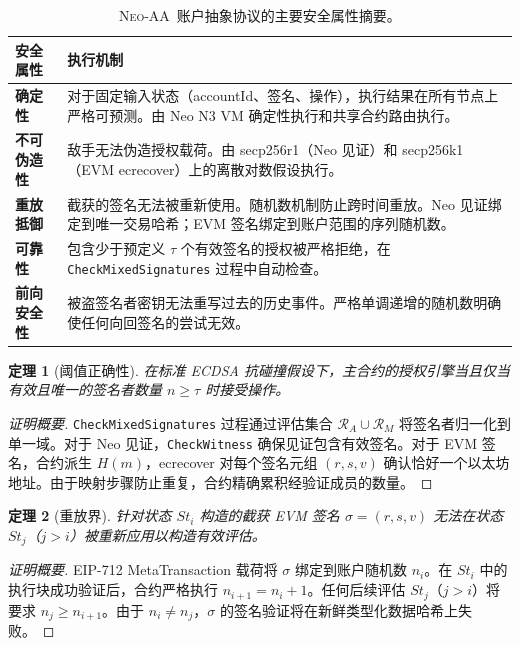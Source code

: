 \documentclass[10pt]{article}
\newtheorem{theorem}{定理}[section]
\newcommand{\sys}{\textsc{Neo-AA}}
\newcommand{\code}[1]{\texttt{\small #1}}
\begin{document}
\begin{table}[htbp]
\centering
\small
\renewcommand{\arraystretch}{1.4}
\begin{tabularx}{\linewidth}{@{}lX@{}}
\toprule
\textbf{\textcolor{sysblue}{安全属性}} & \textbf{\textcolor{sysblue}{执行机制}} \\
\midrule
\textbf{\textcolor{sysgreen}{确定性}} & 对于固定输入状态（accountId、签名、操作），执行结果在所有节点上严格可预测。由 Neo N3 VM 确定性执行和共享合约路由执行。 \\
\textbf{\textcolor{sysgreen}{不可伪造性}} & 敌手无法伪造授权载荷。由 secp256r1（Neo 见证）和 secp256k1（EVM ecrecover）上的离散对数假设执行。 \\
\textbf{\textcolor{sysgreen}{重放抵御}} & 截获的签名无法被重新使用。随机数机制防止跨时间重放。Neo 见证绑定到唯一交易哈希；EVM 签名绑定到账户范围的序列随机数。 \\
\textbf{\textcolor{sysgreen}{可靠性}} & 包含少于预定义 $\tau$ 个有效签名的授权被严格拒绝，在 \code{CheckMixedSignatures} 过程中自动检查。 \\
\textbf{\textcolor{sysgreen}{前向安全性}} & 被盗签名者密钥无法重写过去的历史事件。严格单调递增的随机数明确使任何向回签名的尝试无效。 \\
\bottomrule
\end{tabularx}
\caption{\sys\ 账户抽象协议的主要安全属性摘要。}
\label{tab:cn-security-properties}
\end{table}

\begin{theorem}[阈值正确性]
在标准 ECDSA 抗碰撞假设下，主合约的授权引擎当且仅当有效且唯一的签名者数量 $n \geq \tau$ 时接受操作。
\end{theorem}
\begin{proof}[证明概要]
\code{CheckMixedSignatures} 过程通过评估集合 $\mathcal{R}_A \cup \mathcal{R}_M$ 将签名者归一化到单一域。对于 Neo 见证，\code{CheckWitness} 确保见证包含有效签名。对于 EVM 签名，合约派生 $H(m)$，ecrecover 对每个签名元组 $(r,s,v)$ 确认恰好一个以太坊地址。由于映射步骤防止重复，合约精确累积经验证成员的数量。
\end{proof}

\begin{theorem}[重放界]
针对状态 $St_i$ 构造的截获 EVM 签名 $\sigma = (r, s, v)$ 无法在状态 $St_{j}$（$j > i$）被重新应用以构造有效评估。
\end{theorem}
\begin{proof}[证明概要]
EIP-712 MetaTransaction 载荷将 $\sigma$ 绑定到账户随机数 $n_i$。在 $St_i$ 中的执行块成功验证后，合约严格执行 $n_{i+1} = n_i + 1$。任何后续评估 $St_j$（$j > i$）将要求 $n_j \geq n_{i+1}$。由于 $n_i \neq n_j$，$\sigma$ 的签名验证将在新鲜类型化数据哈希上失败。
\end{proof}
\end{document}
